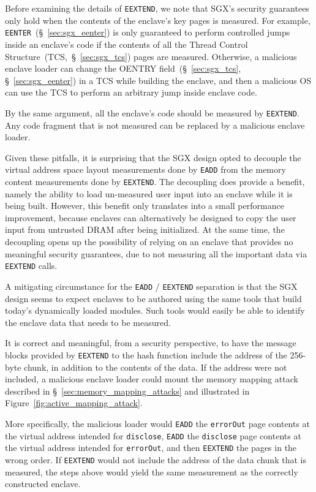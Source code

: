 Before examining the details of \texttt{EEXTEND}, we note that SGX's security
guarantees only hold when the contents of the enclave's key pages is measured.
For example, \texttt{EENTER}~(\S~\ref{sec:sgx_eenter}) is only guaranteed to
perform controlled jumps inside an enclave's code if the contents of all the
Thread Control Structure~(TCS,~\S~\ref{sec:sgx_tcs}) pages are measured.
Otherwise, a malicious enclave loader can change the OENTRY
field~(\S~\ref{sec:sgx_tcs}, \S~\ref{sec:sgx_eenter}) in a TCS while building
the enclave, and then a malicious OS can use the TCS to perform an arbitrary
jump inside enclave code.

By the same argument, all the enclave's code should be measured by
\texttt{EEXTEND}. Any code fragment that is not measured can be replaced by a
malicious enclave loader.

Given these pitfalls, it is surprising that the SGX design opted to decouple
the virtual address space layout measurements done by \texttt{EADD} from the
memory content measurements done by \texttt{EEXTEND}. The decoupling does
provide a benefit, namely the ability to load un-measured user input into an
enclave while it is being built. However, this benefit only translates into a
small performance improvement, because enclaves can alternatively be designed
to copy the user input from untrusted DRAM after being initialized. At the same
time, the decoupling opens up the possibility of relying on an enclave that
provides no meaningful security guarantees, due to not measuring all the
important data via \texttt{EEXTEND} calls.

A mitigating circumstance for the \texttt{EADD} / \texttt{EEXTEND} separation
is that the SGX design seems to expect enclaves to be authored using the same
tools that build today's dynamically loaded modules. Such tools would easily be
able to identify the enclave data that needs to be measured.

It is correct and meaningful, from a security perspective, to have the message
blocks provided by \texttt{EEXTEND} to the hash function include the address of
the 256-byte chunk, in addition to the contents of the data. If the address
were not included, a malicious enclave loader could mount the memory mapping
attack described in \S~\ref{sec:memory_mapping_attacks} and illustrated in
Figure~\ref{fig:active_mapping_attack}.

More specifically, the malicious loader would \texttt{EADD} the
\texttt{errorOut} page contents at the virtual address intended for
\texttt{disclose}, \texttt{EADD} the \texttt{disclose} page contents at the
virtual address intended for \texttt{errorOut}, and then \texttt{EEXTEND} the
pages in the wrong order. If \texttt{EEXTEND} would not include the address of
the data chunk that is measured, the steps above would yield the same
measurement as the correctly constructed enclave.

